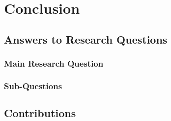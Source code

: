 \chapter{Conclusion} %
\label{Conclusion}


\section{Answers to Research Questions}

\subsection{Main Research Question}

\subsection{Sub-Questions}
%
%

\section{Contributions}

